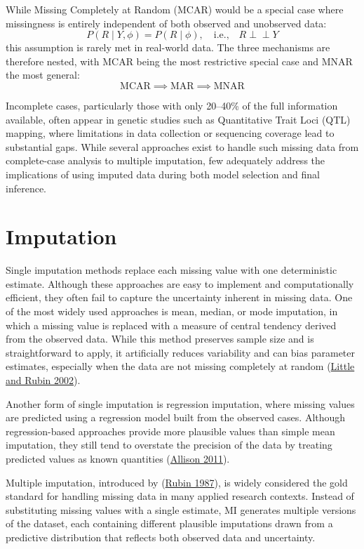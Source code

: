 \documentclass[
  12pt,
]{article}
\begin{document}
While Missing Completely at Random (MCAR) would be a special case where
missingness is entirely independent of both observed and unobserved data:
\[
P(R \mid Y, \phi) = P(R \mid
\phi), \quad \text{i.e.,} \quad
R \perp\!\!\!\perp Y
\]
this assumption is rarely met in real-world data. The three mechanisms are
therefore nested, with MCAR being the most restrictive special case and MNAR
the most general:
\[
\text{MCAR} \implies \text{MAR} \implies \text{MNAR}
\]

Incomplete cases, particularly those with only 20--40\% of the full
information available, often appear in genetic studies such as
Quantitative Trait Loci (QTL) mapping, where limitations in data collection
or sequencing coverage lead to substantial gaps. While several approaches
exist to handle such missing data from complete-case analysis to multiple
imputation, few adequately address the implications of using imputed data
during both model selection and final inference.

\section{Imputation}

Single imputation methods replace each missing value with one
deterministic estimate. Although these approaches are easy to implement
and computationally efficient, they often fail to capture the
uncertainty inherent in missing data. One of the most widely used
approaches is mean, median, or mode imputation, in which a missing value
is replaced with a measure of central tendency derived from the observed
data. While this method preserves sample size and is straightforward to
apply, it artificially reduces variability and can bias parameter
estimates, especially when the data are not missing completely at random
(\protect\hyperlink{ref-little2002statistical}{Little and Rubin 2002}).

Another form of single imputation is regression imputation, where
missing values are predicted using a regression model built from the
observed cases. Although regression-based approaches provide more
plausible values than simple mean imputation, they still tend to
overstate the precision of the data by treating predicted values as
known quantities (\protect\hyperlink{ref-Allison2011}{Allison 2011}).

Multiple imputation, introduced by
(\protect\hyperlink{ref-rubin1987multiple}{Rubin 1987}), is widely
considered the gold standard for handling missing data in many applied
research contexts. Instead of substituting missing values with a single
estimate, MI generates multiple versions of the dataset, each containing
different plausible imputations drawn from a predictive distribution
that reflects both observed data and uncertainty.
\end{document}
